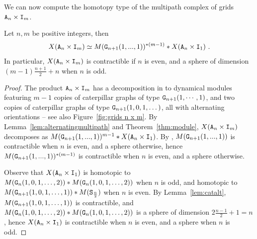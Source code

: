 \documentclass{amsart}
\begin{document}
We can now compute the homotopy type of the multipath complex of grids ${\tt A}_n \times {\tt I}_m$.




\begin{prop}
Let $n, m$ be positive integers, then
\[ X({\tt A}_n \times {\tt I}_m) \simeq M({\tt G}_{n+1}(1,...,1))^{\ast(m-1)}\ast X({\tt A}_n \times {\tt I}_1) \ .\]
In particular, $X({\tt A}_n \times {\tt I}_m)$ is contractible if $n$ is even, and a sphere of dimension  $(m-1)\frac{n+1}{2} + n$ when $n$ is odd. 
\end{prop}

\begin{proof}
The product $ {\tt A}_n \times {\tt I}_m $ has a decomposition in to dynamical modules featuring $m-1$ copies of caterpillar graphs of type ${\tt G}_{n+1}(1,\cdots,1)$, and two copies of caterpillar graphs of type ${\tt G}_{n+1}(1,0,1,\dots)$, all with alternating orientations -- see also Figure~\ref{fig:grids n x m}.  By Lemma~\ref{lem:alternatingmultipath} and Theorem~\ref{thm:module}, $X({\tt A}_n \times {\tt I}_m)$ decomposes as $M({\tt G}_{n+1}(1,...,1))^{m-1}\ast X({\tt A}_n \times {\tt I}_1)$. By \cite[Corollary~5.12]{caterpillar}, $M({\tt G}_{n+1}(1,...,1))$ is contractible when $n$ is even, and a sphere otherwise, hence $M({\tt G}_{n+1}(1,...,1))^{\ast (m-1)}$ is contractible when $n$ is even, and a sphere otherwise. %

Observe that $X({\tt A}_n\times {\tt I}_1)$ is homotopic to $M({\tt G}_{n}(1,0,1,\dots,2))\ast M({\tt G}_{n}(1,0,1,\dots,2))$  when $n$ is odd, and homotopic to $M({\tt G}_{n+1}(1,0,1,\dots,1))\ast M({\tt S}_{\frac{n}{2}})$ when $n$ is even. By Lemma~\ref{lem:catalt}, $M({\tt G}_{n+1}(1,0,1,\dots,1))$ is contractible, and  $M({\tt G}_{n}(1,0,1,\dots,2))\ast M({\tt G}_{n}(1,0,1,\dots,2))$ is a sphere of dimension $2\tfrac{n-1}{2} + 1 = n$, hence $X({\tt A}_n\times {\tt I}_1)$ is contractible when $n$ is even, and a sphere when $n$ is odd. %
\end{proof}
\end{document}

